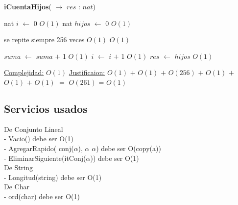 \begin{Algoritmos}
\begin{algorithm}[H]
{\textbf{iCuentaHijos}(} $\to$ $res$ : $nat$)
\begin{algorithmic}[1]

\State nat $i$ $\gets$ 0 \Comment $O(1)$
\State nat $hijos$ $\gets$ 0 \Comment $O(1)$

 \Comment se repite siempre 256 veces $O(1)$
	 \State $O(1)$ 
	
	\State $suma$ $\gets$ $suma$ $+$ 1 \Comment $O(1)$
	\State $i$ $\gets$ $i$ $+$ 1 \Comment $O(1)$
	\EndIf
\EndWhile
\State $res$ $\gets$ $hijos$ \Comment $O(1)$


\medskip
\State \underline{Complejidad:} $O(1)$
\State \underline{Justificaion:}  $O(1)$ $+$ $O(1)$ $+$ $O(256)$ $+$ $O(1)$ $+$ $O(1)$ $+$ $O(1)$ $=$ $O(261)$ = $O(1)$

\end{algorithmic}
\end{algorithm}

  
\end{Algoritmos}


\subsection{Servicios usados} 

De Conjunto Lineal \\
 - Vacio() debe ser O(1) \\ 
 - AgregarRapido( conj($\alpha$), $\alpha$ $\alpha$) debe ser O(copy(a)) \\
 - EliminarSiguiente(itConj($\alpha$)) debe ser O(1) \\

De String \\
 - Longitud(string) debe ser O(1) \\
 
De Char \\
 - ord(char) debe ser O(1) \\
 